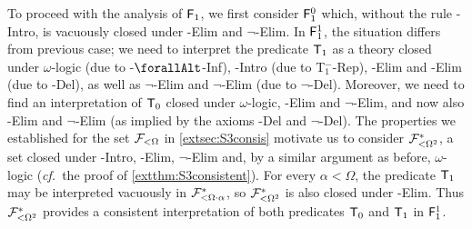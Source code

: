 \documentclass[UKenglish,cleveref,DIV=12]{scrartcl}
\let\forall\forallAlt
\theoremstyle{definition}
\theoremstyle{definition}
\begin{document}
To proceed with the analysis of $\mathsf{F}_1$, we first consider $\mathsf{F}_1^0$ which, without
the rule -Intro, is vacuously closed
under -Elim and $\lnot$-Elim. In $\mathsf{F}_1^1$, the situation differs
from previous case; we need to interpret the predicate $\mathsf{T}_1$ as a theory closed
under $\omega$-logic (due to -$\forall$-Inf), -Intro (due to T$_1^-$-Rep),
-Elim and -Elim (due to -Del), as well as $\lnot$-Elim and $\lnot$-Elim (due to $\lnot$-Del). Moreover, we need to find an interpretation of $\mathsf{T}_0$ closed under $\omega$-logic, -Elim
and $\lnot$-Elim, and now also -Elim and $\lnot$-Elim (as
implied by the axioms -Del and $\lnot$-Del). The properties we established for the set
$\mathcal{F}_{<\Omega}$
in \cref{extsec:S3consis} motivate us to consider $\mathcal{F}^*_{<\Omega^2}$, a set
closed under -Intro, -Elim, $\lnot$-Elim and, by a
similar argument as before, $\omega$-logic ({{\em cf.}~the proof of
\cref{extthm:S3consistent}}). For every $\alpha<\Omega$, the predicate
$\mathsf{T}_1$ may be interpreted vacuously in $\mathcal{F}^*_{<\Omega\cdot\alpha}$, so
$\mathcal{F}^*_{<\Omega^2}$ is also closed under -Elim. Thus $\mathcal{F}^*_{<\Omega^2}$
provides a consistent interpretation of both predicates $\mathsf{T}_0$ and $\mathsf{T}_1$ in
$\mathsf{F}_1^1$.
\end{document}

